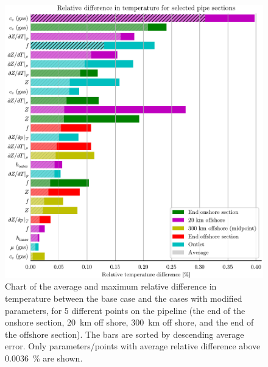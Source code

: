
\begin{figure}[!p]%
    \centering%
    \includegraphics{figures/barchart_all_temperature_absolute.pdf}%
    \caption{%
        Chart of the average and maximum relative difference in temperature between the base case and the cases with modified parameters, for 5 different points on the pipeline (the end of the onshore section, \SI{20}{\kilo\meter} off shore, \SI{300}{\kilo\meter} off shore, and the end of the offshore section). The bars are sorted by descending average error. 
        Only parameters/points with average relative difference above \SI{0.0036}{\percent} are shown.%
        \label{fig:temperatureBarChart}%
    }%
\end{figure}%

